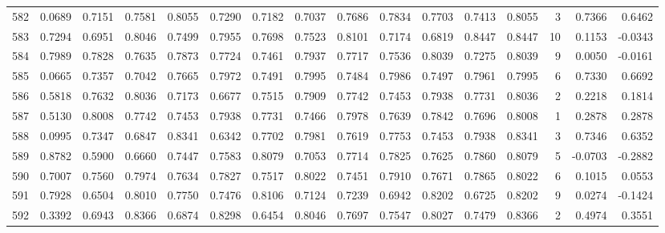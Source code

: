 \begin{tabular}{lrrrrrrrrrrrrrrr}
582 &      0.0689 &  0.7151 &  0.7581 &  0.8055 &  0.7290 &  0.7182 &  0.7037 &  0.7686 &  0.7834 &  0.7703 &   0.7413 &     0.8055 &      3 &                    0.7366 &                     0.6462 \\
583 &      0.7294 &  0.6951 &  0.8046 &  0.7499 &  0.7955 &  0.7698 &  0.7523 &  0.8101 &  0.7174 &  0.6819 &   0.8447 &     0.8447 &     10 &                    0.1153 &                    -0.0343 \\
584 &      0.7989 &  0.7828 &  0.7635 &  0.7873 &  0.7724 &  0.7461 &  0.7937 &  0.7717 &  0.7536 &  0.8039 &   0.7275 &     0.8039 &      9 &                    0.0050 &                    -0.0161 \\
585 &      0.0665 &  0.7357 &  0.7042 &  0.7665 &  0.7972 &  0.7491 &  0.7995 &  0.7484 &  0.7986 &  0.7497 &   0.7961 &     0.7995 &      6 &                    0.7330 &                     0.6692 \\
586 &      0.5818 &  0.7632 &  0.8036 &  0.7173 &  0.6677 &  0.7515 &  0.7909 &  0.7742 &  0.7453 &  0.7938 &   0.7731 &     0.8036 &      2 &                    0.2218 &                     0.1814 \\
587 &      0.5130 &  0.8008 &  0.7742 &  0.7453 &  0.7938 &  0.7731 &  0.7466 &  0.7978 &  0.7639 &  0.7842 &   0.7696 &     0.8008 &      1 &                    0.2878 &                     0.2878 \\
588 &      0.0995 &  0.7347 &  0.6847 &  0.8341 &  0.6342 &  0.7702 &  0.7981 &  0.7619 &  0.7753 &  0.7453 &   0.7938 &     0.8341 &      3 &                    0.7346 &                     0.6352 \\
589 &      0.8782 &  0.5900 &  0.6660 &  0.7447 &  0.7583 &  0.8079 &  0.7053 &  0.7714 &  0.7825 &  0.7625 &   0.7860 &     0.8079 &      5 &                   -0.0703 &                    -0.2882 \\
590 &      0.7007 &  0.7560 &  0.7974 &  0.7634 &  0.7827 &  0.7517 &  0.8022 &  0.7451 &  0.7910 &  0.7671 &   0.7865 &     0.8022 &      6 &                    0.1015 &                     0.0553 \\
591 &      0.7928 &  0.6504 &  0.8010 &  0.7750 &  0.7476 &  0.8106 &  0.7124 &  0.7239 &  0.6942 &  0.8202 &   0.6725 &     0.8202 &      9 &                    0.0274 &                    -0.1424 \\
592 &      0.3392 &  0.6943 &  0.8366 &  0.6874 &  0.8298 &  0.6454 &  0.8046 &  0.7697 &  0.7547 &  0.8027 &   0.7479 &     0.8366 &      2 &                    0.4974 &                     0.3551 \\

\end{tabular}
